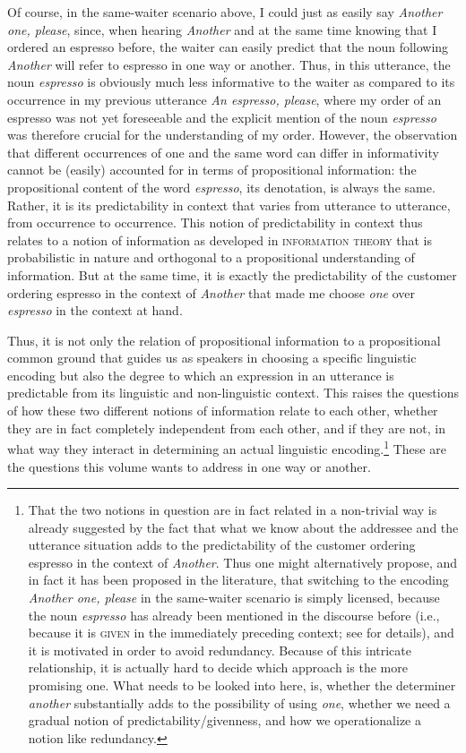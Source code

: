 \documentclass[output=paper,colorlinks,citecolor=brown]{langscibook}
\begin{document}
Of course, in the same-waiter scenario above, I could just as easily say \textit{Another one, please}, since, when hearing \textit{Another} and at the same time knowing that I ordered an espresso before, the waiter can easily predict that the noun following \textit{Another} will refer to espresso in one way or another. Thus, in this utterance, the noun \textit{espresso} is obviously much less informative to the waiter as compared to its occurrence in my previous utterance  \textit{An espresso, please}, where my order of an espresso was not yet foreseeable and the explicit mention of the noun \textit{espresso} was therefore crucial for the understanding of my order. However, the observation that different occurrences of one and the same word can differ in informativity cannot be (easily) accounted for in terms of propositional information: the propositional content of the word \textit{espresso}, its denotation, is always the same. Rather, it is its predictability in context that varies from utterance to utterance, from occurrence to occurrence. This notion of predictability in context thus relates to a notion of information as developed in \textsc{information theory} that is probabilistic in nature and orthogonal to a propositional understanding of information. But at the same time, it is exactly the predictability of the customer ordering espresso in the context of \textit{Another} that made me choose \textit{one} over \textit{espresso} in the context at hand. 

Thus, it is not only the relation of propositional information to a propositional common ground that guides us as speakers in choosing a specific linguistic encoding but also the degree to which an expression in an utterance is predictable from its linguistic and non-linguistic context. This raises the questions of how these two different notions of information relate to each other, whether they are in fact completely independent from each other, and if they are not, in what way they interact in determining an actual linguistic encoding.\footnote{That the two notions in question are in fact related in a non-trivial way is already suggested by the fact that what we know about the addressee and the utterance situation adds to the predictability of the customer ordering espresso in the context of \textit{Another}. Thus one might alternatively propose, and in fact it has been proposed in the literature, that switching to the encoding \textit{Another one, please} in the same-waiter scenario is simply licensed, because the noun \textit{espresso} has already been mentioned in the discourse before (i.e., because it is \textsc{given} in the immediately preceding context; see  for details), and it is motivated in order to avoid redundancy. Because of this intricate relationship, it is actually hard to decide which approach is the more promising one. What needs to be looked into here, is, whether the determiner \textit{another} substantially adds to the possibility of using \textit{one}, whether we need a gradual notion of predictability/givenness, and how we operationalize a notion like redundancy.} These are the questions this volume wants to address in one way or another.
\end{document}
